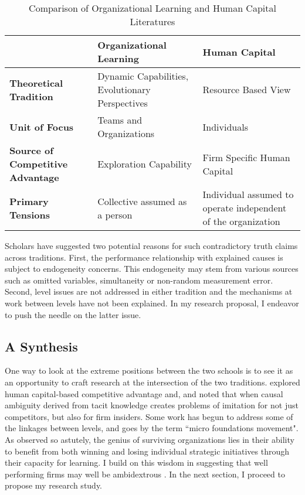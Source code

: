 \documentclass[12pt,letterpaper]{article}
\begin{document}
\begin{table}
\begin{centering}
\caption {Comparison of Organizational Learning and Human Capital Literatures}
\label{qe2a}
{\tabulinesep=1.4mm
\begin{tabu}{|p{0.25\textwidth}|p{0.35\textwidth}|p{0.35\textwidth}|}
\hline
& \textbf{Organizational Learning} & \textbf{Human Capital}  \\
\hline   
\textbf{Theoretical Tradition}& Dynamic Capabilities, Evolutionary Perspectives & Resource Based View  \\\hline
\textbf{Unit of Focus}& Teams and Organizations & Individuals  \\\hline
\textbf{Source of Competitive Advantage}& Exploration Capability & Firm Specific Human Capital  \\\hline
\textbf{Primary Tensions}& Collective assumed as a person & Individual assumed to operate independent of the organization  \\\hline
\end{tabu}}
\end{centering}
\end{table} 

Scholars have suggested two potential reasons for such contradictory truth claims across traditions. First, the performance relationship with explained causes is subject to endogeneity concerns. This endogeneity may stem from various sources such as omitted variables, simultaneity or non-random measurement error. Second, level issues are not addressed in either tradition and the mechanisms at work between levels have not been explained. In my research proposal, I endeavor to push the needle on the latter issue.

\subsection{A Synthesis}
One way to look at the extreme positions between the two schools is to see it as an opportunity to craft research at the intersection of the two traditions. \cite{Coff2011} explored human capital-based competitive advantage and, and noted that when causal ambiguity derived from tacit knowledge creates problems of imitation for not just competitors, but also for firm insiders. Some work \citep{Coff2011, Ployhart2011} has begun to address some of the linkages between levels, and goes by the term ``micro foundations movement". As \cite{Burgelman1991} observed so astutely, the genius of surviving organizations lies in their ability to benefit from both winning and losing individual strategic initiatives through their capacity for learning. I build on this wisdom in suggesting that well performing firms may well be ambidextrous \citep{OReilly2004, OReilly2008}. In the next section, I proceed to propose my research study.
\end{document}
